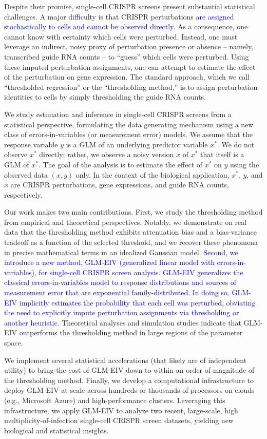 \documentclass[12pt]{article}
\newcommand{\blue}[1]{\textcolor{blue}{#1}}
\begin{document}
Despite their promise, single-cell CRISPR screens present substantial statistical challenges. A major difficulty is that CRISPR perturbations \blue{are assigned stochastically to cells and cannot be observed directly}. As a consequence, one cannot know with certainty which cells were perturbed. Instead, one must leverage an indirect, noisy proxy of perturbation presence or absence -- namely, transcribed guide RNA counts -- to ``guess'' which cells were perturbed. Using these imputed perturbation assignments, one can attempt to estimate the effect of the perturbation on gene expression. The standard approach, which we call ``thresholded regression'' or the ``thresholding method,'' is to assign perturbation identities to cells by simply thresholding the guide RNA counts.

We study estimation and inference in single-cell CRISPR screens from a statistical perspective, formulating the data generating mechanism using a new class of errors-in-variables (or measurement error) models. We assume that the response variable $y$ is a GLM of an underlying predictor variable $x^*$. We do not observe $x^*$ directly; rather, we observe a noisy version $x$ of $x^*$ that itself is a GLM of $x^*$. The goal of the analysis is to estimate the effect of $x^*$ on $y$ using the observed data $(x , y)$ only. In the context of the biological application, $x^*$, $y$, and $x$ are CRISPR perturbations, gene expressions, and guide RNA counts, respectively.

Our work makes two main contributions. First, we study the thresholding method from empirical and theoretical perspectives. Notably, we demonstrate on real data that the thresholding method exhibits attenuation bias and a bias-variance tradeoff as a function of the selected threshold, and we recover these phenomena in precise mathematical terms in an idealized Gaussian model. \blue{Second, we introduce a new method, GLM-EIV (generalized linear model with errors-in-variables), for single-cell CRISPR screen analysis. GLM-EIV generalizes the classical errors-in-variables model to response distributions and sources of measurement error that are exponential family-distributed. In doing so, GLM-EIV implicitly estimates the probability that each cell was perturbed, obviating the need to explicitly impute perturbation assignments via thresholding or another heuristic.} Theoretical analyses and simulation studies indicate that GLM-EIV outperforms the thresholding method in large regions of the parameter space.

We implement several statistical accelerations (that likely are of independent utility) to bring the cost of GLM-EIV down to within an order of magnitude of the thresholding method. Finally, we develop a computational infrastructure to deploy GLM-EIV at-scale across hundreds or thousands of processors on clouds (e.g., Microsoft Azure) and high-performance clusters. Leveraging this infrastructure, we apply GLM-EIV to analyze two recent, large-scale, high multiplicity-of-infection single-cell CRISPR screen datasets, yielding new biological and statistical insights.
\end{document}
